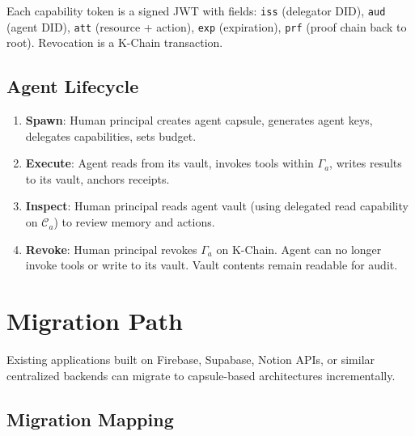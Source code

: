 \documentclass[11pt,a4paper]{article}
\begin{document}
Each capability token is a signed JWT with fields: \texttt{iss} (delegator DID),
\texttt{aud} (agent DID), \texttt{att} (resource + action), \texttt{exp}
(expiration), \texttt{prf} (proof chain back to root). Revocation is a K-Chain
transaction.

\subsection{Agent Lifecycle}

\begin{enumerate}[nosep]
  \item \textbf{Spawn}: Human principal creates agent capsule, generates agent
        keys, delegates capabilities, sets budget.
  \item \textbf{Execute}: Agent reads from its vault, invokes tools within
        $\Gamma_a$, writes results to its vault, anchors receipts.
  \item \textbf{Inspect}: Human principal reads agent vault (using delegated
        read capability on $\mathcal{C}_a$) to review memory and actions.
  \item \textbf{Revoke}: Human principal revokes $\Gamma_a$ on K-Chain.
        Agent can no longer invoke tools or write to its vault. Vault contents
        remain readable for audit.
\end{enumerate}

\section{Migration Path}\label{sec:migration}

Existing applications built on Firebase, Supabase, Notion APIs, or similar
centralized backends can migrate to capsule-based architectures incrementally.

\subsection{Migration Mapping}
\end{document}
